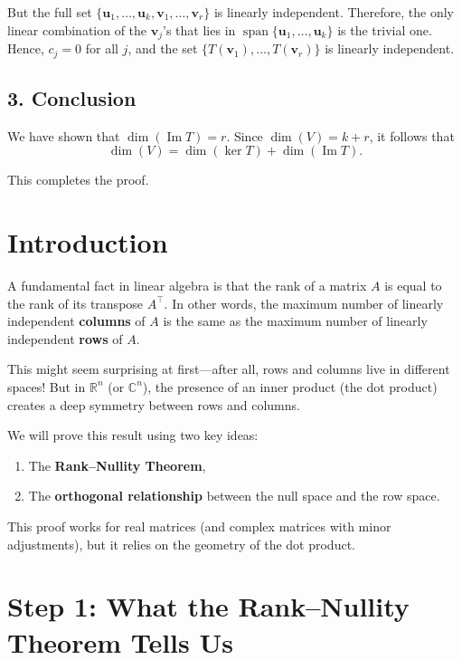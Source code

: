 \documentclass[11pt]{article}
\begin{document}
But the full set $ \{ \mathbf{u}_1, \dots, \mathbf{u}_k, \mathbf{v}_1, \dots, \mathbf{v}_r \} $ is linearly independent.  
Therefore, the only linear combination of the $ \mathbf{v}_j $'s that lies in $ \operatorname{span}\{ \mathbf{u}_1, \dots, \mathbf{u}_k \} $ is the trivial one.  
Hence, $ c_j = 0 $ for all $ j $, and the set $ \{ T(\mathbf{v}_1), \dots, T(\mathbf{v}_r) \} $ is linearly independent.

\subsection*{3. Conclusion}

We have shown that $ \dim(\operatorname{Im} T) = r $. Since $ \dim(V) = k + r $, it follows that
\[
\dim(V) = \dim(\ker T) + \dim(\operatorname{Im} T).
\]

This completes the proof.


\section*{Introduction}

A fundamental fact in linear algebra is that the rank of a matrix $ A $ is equal to the rank of its transpose $ A^\top $.  
In other words, the maximum number of linearly independent \textbf{columns} of $ A $ is the same as the maximum number of linearly independent \textbf{rows} of $ A $.

This might seem surprising at first—after all, rows and columns live in different spaces!  
But in $ \mathbb{R}^n $ (or $ \mathbb{C}^n $), the presence of an inner product (the dot product) creates a deep symmetry between rows and columns.

We will prove this result using two key ideas:
\begin{enumerate}
    \item The \textbf{Rank--Nullity Theorem},
    \item The \textbf{orthogonal relationship} between the null space and the row space.
\end{enumerate}

This proof works for real matrices (and complex matrices with minor adjustments), but it relies on the geometry of the dot product.

\section*{Step 1: What the Rank--Nullity Theorem Tells Us}
\end{document}
